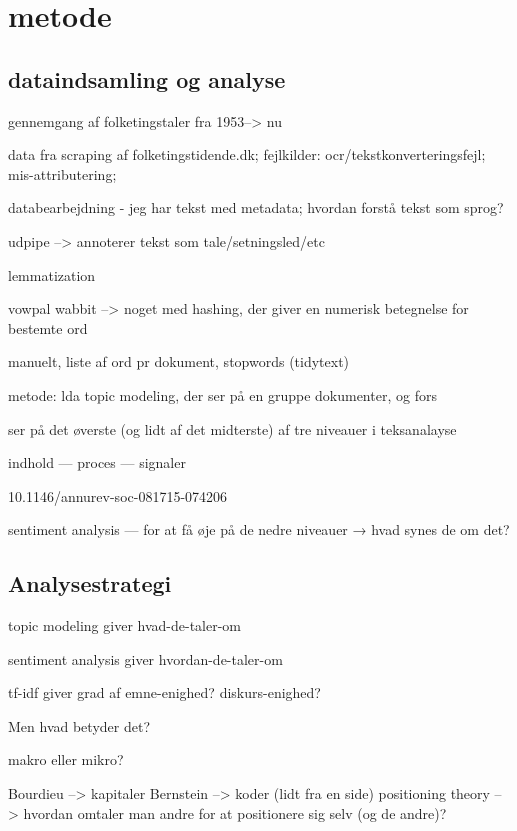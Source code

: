 \section{metode}

\subsection{dataindsamling og analyse}

gennemgang af folketingstaler fra 1953--> nu

data fra scraping af folketingstidende.dk;
fejlkilder: ocr/tekstkonverteringsfejl; mis-attributering;

databearbejdning - jeg har tekst med metadata; hvordan forstå tekst som sprog?

udpipe --> annoterer tekst som tale/setningsled/etc

lemmatization

vowpal wabbit --> noget med hashing, der giver en numerisk betegnelse for bestemte ord

manuelt, liste af ord pr dokument, stopwords (tidytext)

metode: lda topic modeling, der ser på en gruppe dokumenter, og fors

ser på det øverste (og lidt af det midterste) af tre niveauer i teksanalayse

indhold — proces — signaler 

10.1146/annurev-soc-081715-074206

sentiment analysis — for at få øje på de nedre niveauer
→ hvad synes de om det?

\subsection{Analysestrategi}

topic modeling giver hvad-de-taler-om

sentiment analysis giver hvordan-de-taler-om

tf-idf giver grad af emne-enighed? diskurs-enighed?

Men hvad betyder det?

makro eller mikro?

Bourdieu --> kapitaler
Bernstein --> koder
(lidt fra en side) positioning theory --> hvordan omtaler man andre for at positionere sig selv (og de andre)?
